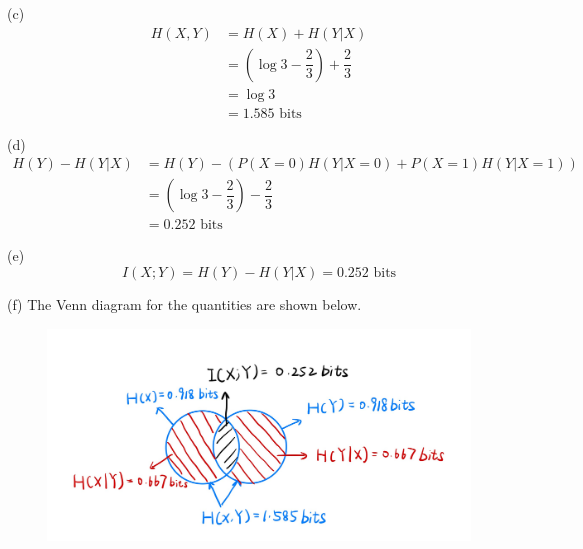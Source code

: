 (c)
\begin{align*}
H(X,Y) &= H(X) + H(Y|X) \\
&= \left(\log 3 - \dfrac{2}{3}\right) + \dfrac{2}{3} \\
&= \log 3 \\
&= 1.585 \text{\ bits}
\end{align*}

(d)
\begin{align*}
H(Y)-H(Y|X) &= H(Y) - \left(P(X=0)H(Y|X=0) + P(X=1)H(Y|X=1)\right) \\
&= \left(\log 3 - \dfrac{2}{3}\right) - \dfrac{2}{3} \\
&= 0.252 \text{\ bits}
\end{align*}

(e)
$$ I(X;Y) = H(Y) - H(Y|X) = 0.252 \text{\ bits}$$

(f) The Venn diagram for the quantities are shown below.

\begin{figure}[htbp]
    \centering
	\includegraphics[width=\textwidth]{../venn.jpg}
\end{figure}

\newpage